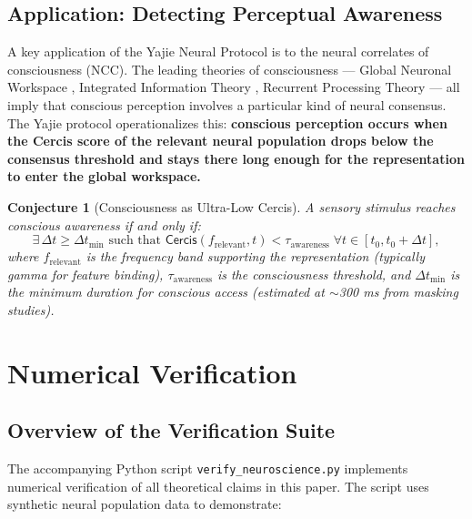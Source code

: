 \documentclass[12pt,a4paper]{article}
\newtheorem{conjecture}[theorem]{Conjecture}
\theoremstyle{remark}
\newcommand{\Cercis}{\textsf{Cercis}}
\newcommand{\Yajie}{\textsf{Yajie}}
\begin{document}
\subsection{Application: Detecting Perceptual Awareness}

A key application of the \Yajie{} Neural Protocol is to the neural correlates
of consciousness (NCC). The leading theories of consciousness --- Global
Neuronal Workspace \cite{dehaene2011experimental}, Integrated Information
Theory \cite{tononi2016integrated}, Recurrent Processing Theory
\cite{lamme2006towards} --- all imply that conscious perception involves a
particular kind of neural consensus. The \Yajie{} protocol operationalizes
this: \textbf{conscious perception occurs when the \Cercis{} score of the
relevant neural population drops below the consensus threshold and stays
there long enough for the representation to enter the global workspace.}

\begin{conjecture}[Consciousness as Ultra-Low Cercis]\label{conj:consciousness-cercis}
A sensory stimulus reaches conscious awareness if and only if:
\begin{equation}\label{eq:consciousness-conj}
    \exists \, \Delta t \geq \Delta t_{\min} \text{ such that } \Cercis(f_{\text{relevant}}, t) < \tau_{\text{awareness}} \; \forall t \in [t_0, t_0 + \Delta t],
\end{equation}
where $f_{\text{relevant}}$ is the frequency band supporting the representation
(typically gamma for feature binding), $\tau_{\text{awareness}}$ is the
consciousness threshold, and $\Delta t_{\min}$ is the minimum duration for
conscious access (estimated at $\sim$300 ms from masking studies).
\end{conjecture}

\section{Numerical Verification}
\label{sec:verification}

\subsection{Overview of the Verification Suite}

The accompanying Python script \texttt{verify\_neuroscience.py} implements
numerical verification of all theoretical claims in this paper. The script
uses synthetic neural population data to demonstrate:
\end{document}
